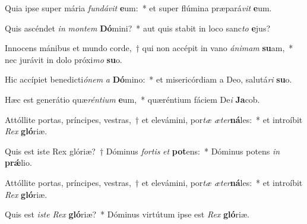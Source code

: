 \item Quia ipse super mária \textit{fun}\textit{dá}\textit{vit} \textbf{e}um:~* et super flúmina præpará\textit{vit} \textbf{e}um.
\item Quis ascéndet \textit{in} \textit{mon}\textit{tem} \textbf{Dó}mini?~* aut quis stabit in loco sanc\textit{to} \textbf{e}jus?
\item Innocens mánibus et mundo corde,~† qui non accépit in vano \textit{á}\textit{ni}\textit{mam} \textbf{su}am,~* nec jurávit in dolo próxi\textit{mo} \textbf{su}o.
\item Hic accípiet benedicti\textit{ó}\textit{nem} \textit{a} \textbf{Dó}mino:~* et misericórdiam a Deo, salutá\textit{ri} \textbf{su}o.
\item Hæc est generátio quæ\textit{rén}\textit{ti}\textit{um} \textbf{e}um,~* quæréntium fáciem De\textit{i} \textbf{Ja}cob.
\item Attóllite portas, príncipes, vestras,~† et elevámini, por\textit{tæ} \textit{æ}\textit{ter}\textbf{ná}les:~* et introíbit \textit{Rex} \textbf{gló}riæ.
\item Quis est iste Rex glóriæ?~† Dóminus \textit{for}\textit{tis} \textit{et} \textbf{pot}ens:~* Dóminus potens \textit{in} \textbf{prǽ}lio.
\item Attóllite portas, príncipes, vestras,~† et elevámini, por\textit{tæ} \textit{æ}\textit{ter}\textbf{ná}les:~* et introíbit \textit{Rex} \textbf{gló}riæ.
\item Quis est \textit{is}\textit{te} \textit{Rex} \textbf{gló}riæ?~* Dóminus virtútum ipse est \textit{Rex} \textbf{gló}riæ.
